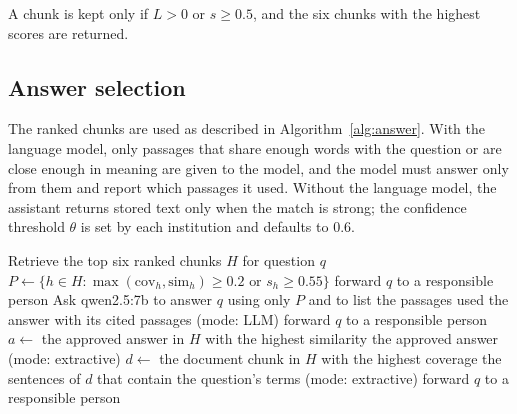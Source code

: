 A chunk is kept only if $L > 0$ or $s \geq 0.5$, and the six chunks with the highest scores are returned.

\subsection{Answer selection}
The ranked chunks are used as described in Algorithm~\ref{alg:answer}. With the language model, only passages that share enough words with the question or are close enough in meaning are given to the model, and the model must answer only from them and report which passages it used. Without the language model, the assistant returns stored text only when the match is strong; the confidence threshold $\theta$ is set by each institution and defaults to 0.6.

\begin{algorithm}
    \caption{Choosing the answer to a knowledge question}
    \label{alg:answer}
    \begin{algorithmic}[1]
    \State Retrieve the top six ranked chunks $H$ for question $q$
        \State $P \gets \{h \in H : \max(\mathrm{cov}_h, \mathrm{sim}_h) \geq 0.2 \text{ or } s_h \geq 0.55\}$
            \State \Return forward $q$ to a responsible person
        \EndIf
        \State Ask qwen2.5:7b to answer $q$ using only $P$ and to list the passages used
            \State \Return the answer with its cited passages (mode: LLM)
            \State \Return forward $q$ to a responsible person
        \EndIf
        \State {}
    \EndIf
    \State $a \gets$ the approved answer in $H$ with the highest similarity
        \State \Return the approved answer (mode: extractive)
    \EndIf
    \State $d \gets$ the document chunk in $H$ with the highest coverage
        \State \Return the sentences of $d$ that contain the question's terms (mode: extractive)
    \EndIf
    \State \Return forward $q$ to a responsible person
    \end{algorithmic}
\end{algorithm}

